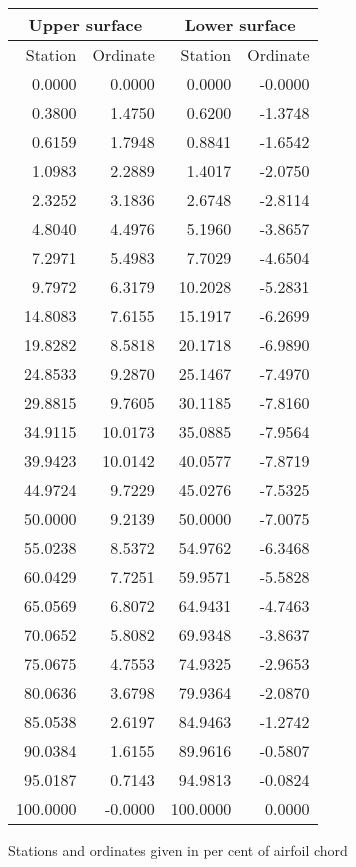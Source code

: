 \documentclass[11pt]{book}
\begin{document}
 \hspace{4mm}
 \begin{tabular}{|r|r|r|r|} \hline 
 \multicolumn{2}{|c|}{Upper surface} & \multicolumn{2}{|c|}{Lower surface} \\
 \hline
 Station & Ordinate & Station & Ordinate \\
 \hline
0.0000 & 0.0000 & 0.0000 & -0.0000 \\
0.3800 & 1.4750 & 0.6200 & -1.3748 \\
0.6159 & 1.7948 & 0.8841 & -1.6542 \\
1.0983 & 2.2889 & 1.4017 & -2.0750 \\
2.3252 & 3.1836 & 2.6748 & -2.8114 \\
4.8040 & 4.4976 & 5.1960 & -3.8657 \\
7.2971 & 5.4983 & 7.7029 & -4.6504 \\
9.7972 & 6.3179 & 10.2028 & -5.2831 \\
14.8083 & 7.6155 & 15.1917 & -6.2699 \\
19.8282 & 8.5818 & 20.1718 & -6.9890 \\
24.8533 & 9.2870 & 25.1467 & -7.4970 \\
29.8815 & 9.7605 & 30.1185 & -7.8160 \\
34.9115 & 10.0173 & 35.0885 & -7.9564 \\
39.9423 & 10.0142 & 40.0577 & -7.8719 \\
44.9724 & 9.7229 & 45.0276 & -7.5325 \\
50.0000 & 9.2139 & 50.0000 & -7.0075 \\
55.0238 & 8.5372 & 54.9762 & -6.3468 \\
60.0429 & 7.7251 & 59.9571 & -5.5828 \\
65.0569 & 6.8072 & 64.9431 & -4.7463 \\
70.0652 & 5.8082 & 69.9348 & -3.8637 \\
75.0675 & 4.7553 & 74.9325 & -2.9653 \\
80.0636 & 3.6798 & 79.9364 & -2.0870 \\
85.0538 & 2.6197 & 84.9463 & -1.2742 \\
90.0384 & 1.6155 & 89.9616 & -0.5807 \\
95.0187 & 0.7143 & 94.9813 & -0.0824 \\
100.0000 & -0.0000 & 100.0000 & 0.0000 \\
 \hline 
 \end{tabular}
 \vspace{8mm}

Stations and ordinates given in per cent of airfoil chord
\end{document}
